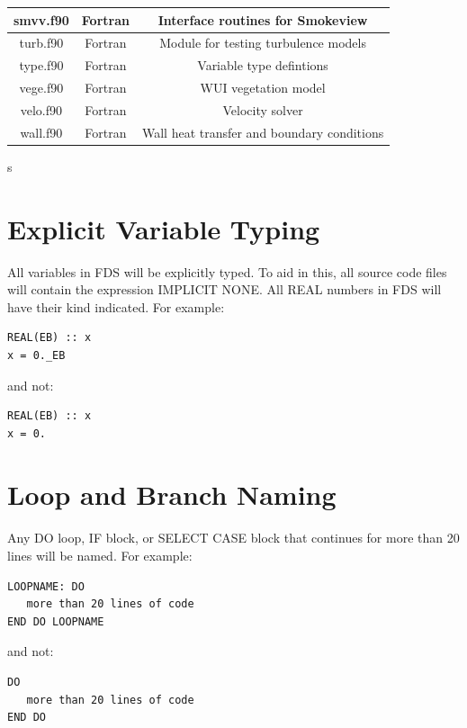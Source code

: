 \documentclass[11pt]{book}
\begin{document}
\begin{table}[ht]
\begin{center}
\begin{tabular}{|c|c|c|}
smvv.f90     & Fortran  & Interface routines for Smokeview \\ \hline 
turb.f90     & Fortran  & Module for testing turbulence models \\ \hline 
type.f90     & Fortran  & Variable type defintions \\ \hline 
vege.f90     & Fortran  & WUI vegetation model \\ \hline 
velo.f90     & Fortran  & Velocity solver \\ \hline 
wall.f90     & Fortran  & Wall heat transfer and boundary conditions                   \\ \hline
\end{tabular}s
\end{center}
\end{table}

\section{Explicit Variable Typing}

All variables in FDS will be explicitly typed.  To aid in this, all source code files will contain the expression
{\ct IMPLICIT NONE}.  All {\ct REAL} numbers in FDS will have their kind indicated.  For example:

\begin{verbatim}
REAL(EB) :: x
x = 0._EB
\end{verbatim}

and not:

\begin{verbatim}
REAL(EB) :: x
x = 0.
\end{verbatim}

\section{Loop and Branch Naming}

Any {\ct DO} loop, {\ct IF} block, or {\ct SELECT CASE} block that continues for more than 20 lines will be named.
For example:

\begin{verbatim}
LOOPNAME: DO 
   more than 20 lines of code
END DO LOOPNAME
\end{verbatim}

and not:

\begin{verbatim}
DO 
   more than 20 lines of code
END DO
\end{verbatim}
\end{document}
